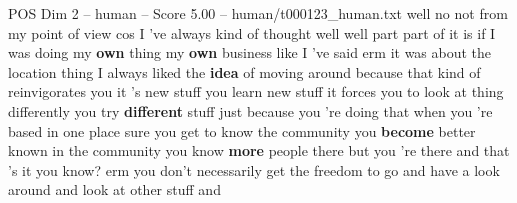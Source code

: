 \begin{textsample}{POS Dim 2 – human – Score 5.00 – human/t000123\_human.txt}  \label{ex:f2_pos_035}
well no not from my point of view cos I 've always kind of thought well well part part of it is if I was doing my \textbf{own} thing my \textbf{own} business like I 've said erm it was about the location thing I always liked the \textbf{idea} of moving around because that kind of reinvigorates you it 's new stuff you learn new stuff it forces you to look at thing differently you try \textbf{different} stuff just because you 're doing that when you 're based in one place sure you get to know the community you \textbf{become} better known in the community you know \textbf{more} people there but you 're there and that 's it you know? erm you don't necessarily get the freedom to go and have a look around and look at other stuff and

\end{textsample}
